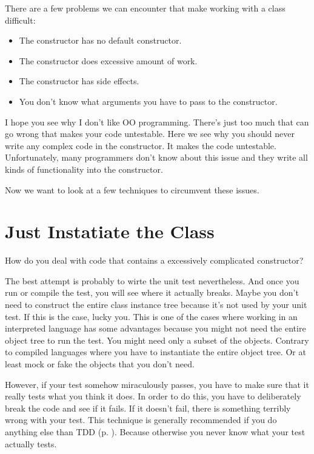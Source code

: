 There are a few problems we can encounter that make working with a class difficult:
\begin{itemize}
    \item The constructor has no default constructor.
    \item The constructor does excessive amount of work.
    \item The constructor has side effects.
    \item You don't know what arguments you have to pass to the constructor.
\end{itemize}

I hope you see why I don't like OO programming. There's just too much that can go wrong that makes your code untestable. Here we see why you should never write any complex code in the constructor. It makes the code untestable. Unfortunately, many programmers don't know about this issue and they write all kinds of functionality into the constructor.

Now we want to look at a few techniques to circumvent these issues.

\section{Just Instatiate the Class}

How do you deal with code that contains a excessively complicated constructor?

The best attempt is probably to wirte the unit test nevertheless. And once you run or compile the test, you will see where it actually breaks. Maybe you don't need to construct the entire class instance tree because it's not used by your unit test. If this is the case, lucky you. This is one of the cases where working in an interpreted language has some advantages because you might not need the entire object tree to run the test. You might need only a subset of the objects. Contrary to compiled languages where you have to instantiate the entire object tree. Or at least mock or fake the objects that you don't need.

However, if your test somehow miraculously passes, you have to make sure that it really tests what you think it does. In order to do this, you have to deliberately break the code and see if it fails. If it doesn't fail, there is something terribly wrong with your test. This technique is generally recommended if you do anything else than TDD (p. \pageref{chap:tdd}). Because otherwise you never know what your test actually tests.


